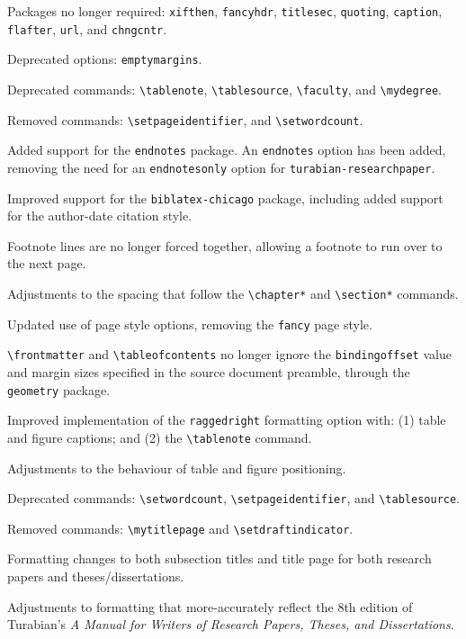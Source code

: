 \documentclass{article}
\newcommand{\textcmd}[1]{\texttt{\textbackslash #1}}
\begin{document}
Packages no longer required: \texttt{xifthen}, \texttt{fancyhdr}, \texttt{titlesec}, \texttt{quoting}, \texttt{caption}, \texttt{flafter}, \texttt{url}, and \texttt{chngcntr}.

Deprecated options: \texttt{emptymargins}.

Deprecated commands: \textcmd{tablenote}, \textcmd{tablesource}, \textcmd{faculty}, and \textcmd{mydegree}.

Removed commands: \textcmd{setpageidentifier}, and \textcmd{setwordcount}.

%

Added support for the \texttt{endnotes} package. An \texttt{endnotes} option has been added, removing the need for an \texttt{endnotesonly} option for \texttt{turabian-researchpaper}.

Improved support for the \texttt{biblatex-chicago} package, including added support for the author-date citation style.

Footnote lines are no longer forced together, allowing a footnote to run over to the next page.

Adjustments to the spacing that follow the \textcmd{chapter*} and \textcmd{section*} commands.

Updated use of page style options, removing the \texttt{fancy} page style.

\textcmd{frontmatter} and \textcmd{tableofcontents} no longer ignore the \texttt{bindingoffset} value and margin sizes specified in the source document preamble, through the \texttt{geometry} package.

Improved implementation of the \texttt{raggedright} formatting option with: (1) table and figure captions; and (2) the \textcmd{tablenote} command.

Adjustments to the behaviour of table and figure positioning.

Deprecated commands: \textcmd{setwordcount}, \textcmd{setpageidentifier}, and \textcmd{tablesource}.

Removed commands: \textcmd{mytitlepage} and \textcmd{setdraftindicator}.

%
Formatting changes to both subsection titles and title page for both research papers and theses/dissertations.

%
Adjustments to formatting that more-accurately reflect the 8th edition of Turabian's \emph{A Manual for Writers of Research Papers, Theses, and Dissertations}.
\end{document}
